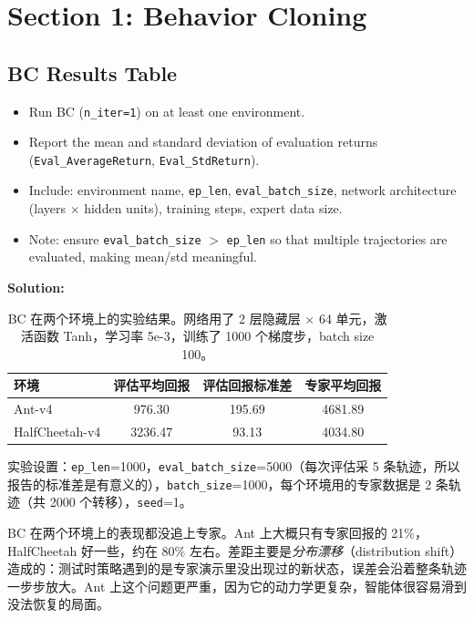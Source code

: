 \documentclass{article}
\begin{document}
\newpage
\section{Section 1: Behavior Cloning}

\subsection{BC Results Table}
\begin{itemize}
    \item Run BC (\verb|n_iter=1|) on at least one environment.
    \item Report the mean and standard deviation of evaluation returns (\verb|Eval_AverageReturn|, \verb|Eval_StdReturn|).
    \item Include: environment name, \verb|ep_len|, \verb|eval_batch_size|, network architecture (layers $\times$ hidden units), training steps, expert data size.
    \item Note: ensure \verb|eval_batch_size| $>$ \verb|ep_len| so that multiple trajectories are evaluated, making mean/std meaningful.
\end{itemize}

\textbf{Solution:}

\begin{table}[H]
\centering
\begin{tabular}{|l|c|c|c|}
\hline
\textbf{环境} & \textbf{评估平均回报} & \textbf{评估回报标准差} & \textbf{专家平均回报} \\
\hline
Ant-v4 & 976.30 & 195.69 & 4681.89 \\
HalfCheetah-v4 & 3236.47 & 93.13 & 4034.80 \\
\hline
\end{tabular}
\caption{BC 在两个环境上的实验结果。网络用了 2 层隐藏层 $\times$ 64 单元，激活函数 Tanh，学习率 5e-3，训练了 1000 个梯度步，batch size 100。}
\end{table}

实验设置：\verb|ep_len|=1000，\verb|eval_batch_size|=5000（每次评估采 5 条轨迹，所以报告的标准差是有意义的），\verb|batch_size|=1000，每个环境用的专家数据是 2 条轨迹（共 2000 个转移），\verb|seed|=1。

BC 在两个环境上的表现都没追上专家。Ant 上大概只有专家回报的 21\%，HalfCheetah 好一些，约在 80\% 左右。差距主要是\emph{分布漂移}（distribution shift）造成的：测试时策略遇到的是专家演示里没出现过的新状态，误差会沿着整条轨迹一步步放大。Ant 上这个问题更严重，因为它的动力学更复杂，智能体很容易滑到没法恢复的局面。
\end{document}
